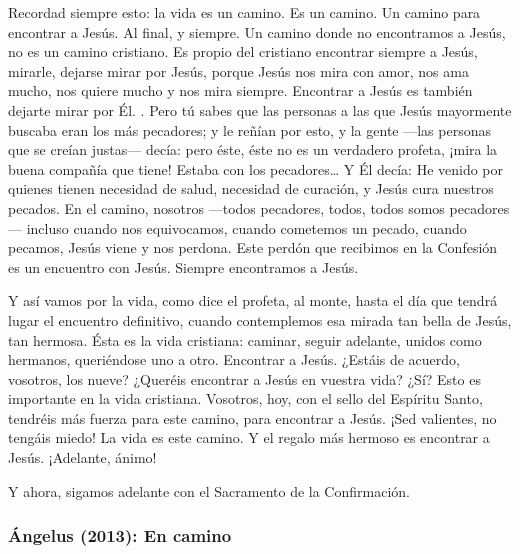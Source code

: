 \begin{body}
	Recordad siempre esto: la vida es un camino. Es un camino. Un camino para encontrar a Jesús. Al final, y siempre. Un camino donde no encontramos a Jesús, no es un camino cristiano. Es propio del cristiano encontrar siempre a Jesús, mirarle, dejarse mirar por Jesús, porque Jesús nos mira con amor, nos ama mucho, nos quiere mucho y nos mira siempre. Encontrar a Jesús es también dejarte mirar por Él. . Pero tú sabes que las personas a las que Jesús mayormente buscaba eran los más pecadores; y le reñían por esto, y la gente ---las personas que se creían justas--- decía: pero éste, éste no es un verdadero profeta, ¡mira la buena compañía que tiene! Estaba con los pecadores\ldots{} Y Él decía: He venido por quienes tienen necesidad de salud, necesidad de curación, y Jesús cura nuestros pecados. En el camino, nosotros ---todos pecadores, todos, todos somos pecadores--- incluso cuando nos equivocamos, cuando cometemos un pecado, cuando pecamos, Jesús viene y nos perdona. Este perdón que recibimos en la Confesión es un encuentro con Jesús. Siempre encontramos a Jesús. 
	
	Y así vamos por la vida, como dice el profeta, al monte, hasta el día que tendrá lugar el encuentro definitivo, cuando contemplemos esa mirada tan bella de Jesús, tan hermosa. Ésta es la vida cristiana: caminar, seguir adelante, unidos como hermanos, queriéndose uno a otro. Encontrar a Jesús. ¿Estáis de acuerdo, vosotros, los nueve? ¿Queréis encontrar a Jesús en vuestra vida? ¿Sí? Esto es importante en la vida cristiana. Vosotros, hoy, con el sello del Espíritu Santo, tendréis más fuerza para este camino, para encontrar a Jesús. ¡Sed valientes, no tengáis miedo! La vida es este camino. Y el regalo más hermoso es encontrar a Jesús. ¡Adelante, ánimo! 
	
	Y ahora, sigamos adelante con el Sacramento de la Confirmación.
\end{body}

\subsubsection{Ángelus (2013): En camino}


